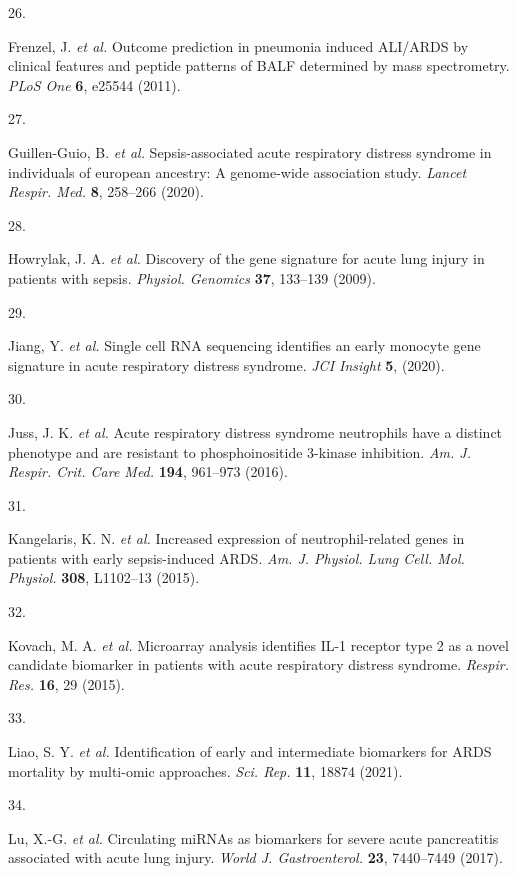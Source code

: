 \documentclass[
  11,
  a4paper,
]{article}
\newlength{\cslhangindent}
\newlength{\csllabelwidth}
\newenvironment{CSLReferences}[2] %
 {\begin{list}{}{%
  \setlength{\itemindent}{0pt}
  \setlength{\leftmargin}{0pt}
  \setlength{\parsep}{0pt}
  \ifodd #1
   \setlength{\leftmargin}{\cslhangindent}
   \setlength{\itemindent}{-1\cslhangindent}
  \fi
  \setlength{\itemsep}{#2\baselineskip}}}
 {\end{list}}
\newcommand{\CSLLeftMargin}[1]{\parbox[t]{\csllabelwidth}{\strut#1\strut}}
\newcommand{\CSLRightInline}[1]{\parbox[t]{\linewidth - \csllabelwidth}{\strut#1\strut}}
\begin{document}
\begin{CSLReferences}{0}{0}
\CSLLeftMargin{26. }%
\CSLRightInline{Frenzel, J. \emph{et al.} Outcome prediction in
pneumonia induced {ALI/ARDS} by clinical features and peptide patterns
of {BALF} determined by mass spectrometry. \emph{PLoS One} \textbf{6},
e25544 (2011).}

\CSLLeftMargin{27. }%
\CSLRightInline{Guillen-Guio, B. \emph{et al.} Sepsis-associated acute
respiratory distress syndrome in individuals of european ancestry: A
genome-wide association study. \emph{Lancet Respir. Med.} \textbf{8},
258--266 (2020).}

\CSLLeftMargin{28. }%
\CSLRightInline{Howrylak, J. A. \emph{et al.} Discovery of the gene
signature for acute lung injury in patients with sepsis. \emph{Physiol.
Genomics} \textbf{37}, 133--139 (2009).}

\CSLLeftMargin{29. }%
\CSLRightInline{Jiang, Y. \emph{et al.} Single cell {RNA} sequencing
identifies an early monocyte gene signature in acute respiratory
distress syndrome. \emph{JCI Insight} \textbf{5}, (2020).}

\CSLLeftMargin{30. }%
\CSLRightInline{Juss, J. K. \emph{et al.} Acute respiratory distress
syndrome neutrophils have a distinct phenotype and are resistant to
phosphoinositide 3-kinase inhibition. \emph{Am. J. Respir. Crit. Care
Med.} \textbf{194}, 961--973 (2016).}

\CSLLeftMargin{31. }%
\CSLRightInline{Kangelaris, K. N. \emph{et al.} Increased expression of
neutrophil-related genes in patients with early sepsis-induced {ARDS}.
\emph{Am. J. Physiol. Lung Cell. Mol. Physiol.} \textbf{308}, L1102--13
(2015).}

\CSLLeftMargin{32. }%
\CSLRightInline{Kovach, M. A. \emph{et al.} Microarray analysis
identifies {IL-1} receptor type 2 as a novel candidate biomarker in
patients with acute respiratory distress syndrome. \emph{Respir. Res.}
\textbf{16}, 29 (2015).}

\CSLLeftMargin{33. }%
\CSLRightInline{Liao, S. Y. \emph{et al.} Identification of early and
intermediate biomarkers for {ARDS} mortality by multi-omic approaches.
\emph{Sci. Rep.} \textbf{11}, 18874 (2021).}

\CSLLeftMargin{34. }%
\CSLRightInline{Lu, X.-G. \emph{et al.} Circulating {miRNAs} as
biomarkers for severe acute pancreatitis associated with acute lung
injury. \emph{World J. Gastroenterol.} \textbf{23}, 7440--7449 (2017).}


\end{CSLReferences}
\end{document}
